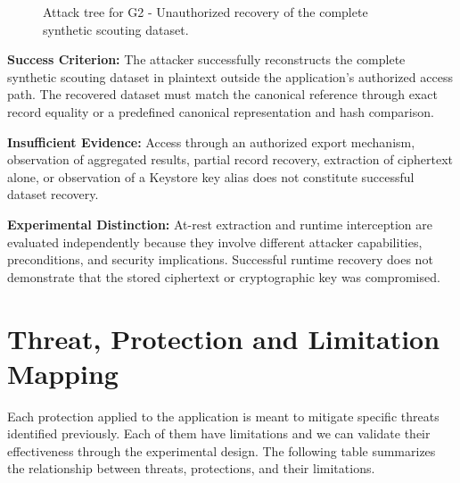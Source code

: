 \documentclass{article}
\newcounter{threat}
\begin{document}
\begin{figure}[htbp]
{
}

\caption{Attack tree for G2 - Unauthorized recovery
of the complete synthetic scouting dataset.}
\label{fig:attack-tree-g2}

\end{figure}

\noindent
\textbf{Success Criterion:}
The attacker successfully reconstructs the complete
synthetic scouting dataset in plaintext outside the
application's authorized access path. The recovered
dataset must match the canonical reference through
exact record equality or a predefined canonical
representation and hash comparison.

\medskip

\noindent
\textbf{Insufficient Evidence:}
Access through an authorized export mechanism,
observation of aggregated results, partial record
recovery, extraction of ciphertext alone, or
observation of a Keystore key alias does not
constitute successful dataset recovery.

\medskip

\noindent
\textbf{Experimental Distinction:}
At-rest extraction and runtime interception are
evaluated independently because they involve
different attacker capabilities, preconditions,
and security implications. Successful runtime
recovery does not demonstrate that the stored
ciphertext or cryptographic key was compromised.

\pagebreak

\section{Threat, Protection and Limitation Mapping}

Each protection applied to the application is meant to mitigate specific threats identified previously. Each of them have limitations and we can validate their effectiveness through the experimental design. The following table summarizes the relationship between threats, protections, and their limitations.
\end{document}
